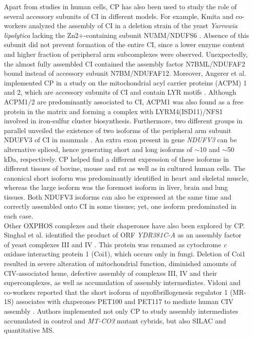 Apart from studies in human cells, CP has also been used to study the role of several accessory subunits of CI in different models. For example, Kmita and co-workers analyzed the assembly of CI in a deletion strain of the yeast \emph{Yarrowia lipolytica} lacking the Zn2+-containing subunit NUMM/NDUFS6 \cite{Kmita_2015}. Absence of this subunit did not prevent formation of the entire CI, since a lower enzyme content and higher fraction of peripheral arm subcomplexes were observed. Unexpectedly, the almost fully assembled CI contained the assembly factor N7BML/NDUFAF2 bound instead of accessory subunit N7BM/NDUFAF12. Moreover, Angerer et al. implemented CP in a study on the mitochondrial acyl carrier proteins (ACPM) 1 and 2, which are accessory subunits of CI and contain LYR motifs \cite{Angerer_2014}. Although ACPM1/2 are predominantly associated to CI, ACPM1 was also found as a free protein in the matrix and forming a complex with LYRM4(ISD11)/NFS1 involved in iron-sulfur cluster biosynthesis. Furthermore, two different groups in parallel unveiled the existence of two isoforms of the peripheral arm subunit NDUFV3 of CI in mammals \cite{Bridges_2017, Guerrero-Castillo_2017b}. An extra exon present in gene \emph{NDUFV3} can be alternative spliced, hence generating short and long isoforms of $\sim$10 and $\sim$50 kDa, respectively. CP helped find a different expression of these isoforms in different tissues of bovine, mouse and rat as well as in cultured human cells. The canonical short isoform was predominantly identified in heart and skeletal muscle, whereas the large isoform was the foremost isoform in liver, brain and lung tissues. Both NDUFV3 isoforms can also be expressed at the same time and correctly assembled onto CI in some tissues; yet, one isoform predominated in each case.\\
Other OXPHOS complexes and their chaperones have also been explored by CP. Singhal et al. identified the product of ORF \emph{YDR381C-A} as an assembly factor of yeast complexes III and IV \cite{Singhal_2017}. This protein was renamed as cytochrome \emph{c} oxidase interacting protein 1 (Coi1), which occurs only in fungi. Deletion of Coi1 resulted in severe alteration of mitochondrial function, diminished amounts of CIV-associated heme, defective assembly of complexes III, IV and their supercomplexes, as well as accumulation of assembly intermediates. Vidoni and co-workers reported that the short isoform of myofibrillogenesis regulator 1 (MR-1S) associates with chaperones PET100 and PET117 to mediate human CIV assembly \cite{Vidoni_2017}. Authors implemented not only CP to study assembly intermediates accumulated in control and \emph{MT-CO3} mutant cybrids, but also SILAC and quantitative MS.\\
